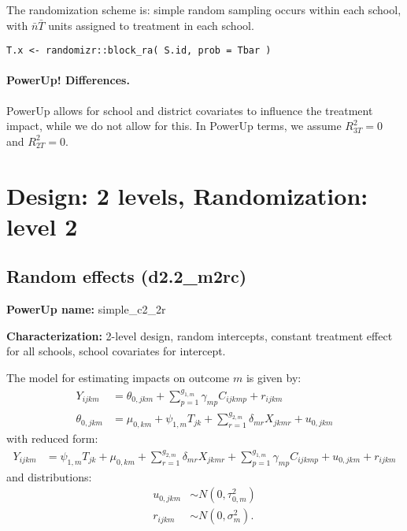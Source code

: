 \documentclass[12pt]{article}
\begin{document}
The randomization scheme is: simple random sampling occurs within each school, with $\bar{n}\bar{T}$ units assigned to treatment in each school.
\begin{verbatim}
T.x <- randomizr::block_ra( S.id, prob = Tbar )
\end{verbatim}

\paragraph{PowerUp! Differences.}
PowerUp allows for school and district covariates to influence the treatment impact, while we do not allow for this. In PowerUp terms, we assume $R^2_{3T} = 0$ and $R^2_{2T} = 0$.





\newpage 
\section{Design: 2 levels, Randomization: level 2}


\subsection{Random effects (d2.2\_m2rc)}

\textbf{PowerUp name:} simple\_c2\_2r

\textbf{Characterization:} 2-level design, random intercepts, constant treatment effect for all schools, school covariates for intercept.

The model for estimating impacts on outcome $m$ is given by:
\begin{align}
Y_{ijkm} &=  \theta_{0,jkm} + \sum_{p=1}^{g_{1,m}} \gamma_{mp} C_{ijkmp} + r_{ijkm}\\
\nonumber \theta_{0,jkm} &= \mu_{0,km} + \psi_{1,m} T_{jk} + \sum_{r=1}^{g_{2,m}} \delta_{mr} X_{jkmr} + u_{0,jkm}
\end{align}
with reduced form:
\begin{align}
Y_{ijkm} &= \psi_{1,m} T_{jk} + \mu_{0,km} + \sum_{r=1}^{g_{2,m}} \delta_{mr} X_{jkmr} + \sum_{p=1}^{g_{1,m}} \gamma_{mp} C_{ijkmp} + u_{0,jkm} + r_{ijkm}
\end{align}
and distributions:
\begin{align}
u_{0,jkm} &\sim N\left(0, \tau^2_{0,m}\right)\\
\nonumber r_{ijkm} &\sim N\left(0, \sigma^2_m\right).
\end{align}
\end{document}
